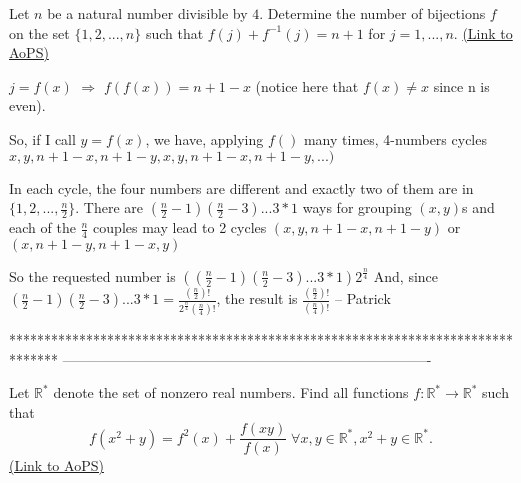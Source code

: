 \begin{problem}
	Let $n$ be a natural number divisible by $4$. Determine the number of bijections $f$ on the set $\{1,2,...,n\}$ such that $f (j )+f^{-1}(j ) = n+1$ for $j = 1,..., n.$
	\flushright \href{https://artofproblemsolving.com/community/c6h150114}{(Link to AoPS)}
\end{problem}



\begin{mysolution}
	$ j = f(x)$ $ \Rightarrow$ $ f(f(x)) = n + 1 - x$ (notice here that $ f(x)\neq x$ since n is even).

So, if I call $ y = f(x)$, we have, applying $ f()$ many times,  4-numbers cycles $ x,y,n + 1 - x, n + 1 - y, x, y, n + 1 - x, n + 1 - y, ...)$

In each cycle, the four numbers are different and exactly two of them are in $ \{1,2,...,\frac {n}{2}\}$.
There are $ (\frac {n}{2} - 1)(\frac {n}{2} - 3)...3*1$ ways for grouping $ (x,y)$s and each of the $ \frac {n}{4}$ couples may lead to 2 cycles $ (x,y,n + 1 - x,n + 1 - y)$ or $ (x,n + 1 - y,n + 1 - x,y)$

So the requested number is $ ((\frac {n}{2} - 1)(\frac {n}{2} - 3)...3*1)2^{\frac {n}{4}}$
And, since 
$ (\frac {n}{2} - 1)(\frac {n}{2} - 3)...3*1 = \frac {(\frac {n}{2})!}{2^{\frac {n}{4}}(\frac {n}{4})!}$, the result is $ \frac {(\frac {n}{2})!}{(\frac {n}{4})!}$
-- 
Patrick
\end{mysolution}
*******************************************************************************
-------------------------------------------------------------------------------

\begin{problem}
	Let $\mathbb{R}^{*}$ denote the set of nonzero real numbers. Find all functions $f: \mathbb{R}^{*}\to\mathbb{R}^{*}$ such that \[f(x^{2}+y)=f^{2}(x)+\frac{f(xy)}{f(x)}\; \forall x,y\in\mathbb{R}^{*},x^{2}+y\in\mathbb{R}^{*}.\]
	\flushright \href{https://artofproblemsolving.com/community/c6h151360}{(Link to AoPS)}
\end{problem}



